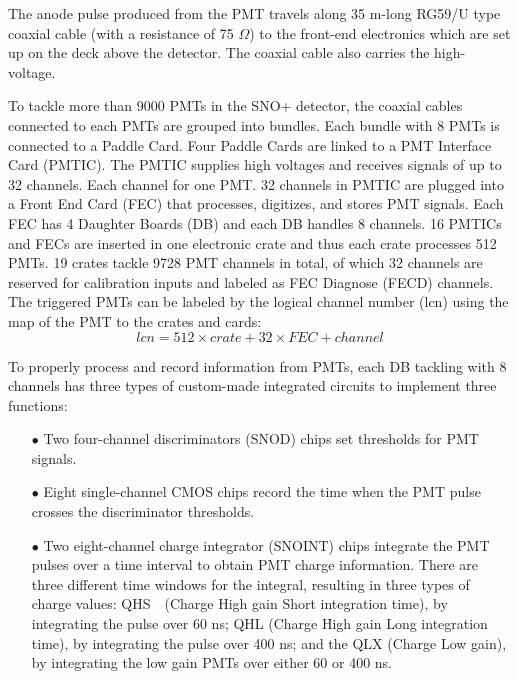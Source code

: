 The anode pulse produced from the PMT travels along 35 m-long RG59/U type coaxial cable (with a resistance of 75 $\Omega$) to the front-end electronics which are set up on the deck above the detector. The coaxial cable also carries the high-voltage\cite{boger2000sudbury}. 

To tackle more than 9000 PMTs in the SNO+ detector, the coaxial cables connected to each PMTs are grouped into bundles. Each bundle with 8 PMTs is connected to a Paddle Card. Four Paddle Cards are linked to a PMT Interface Card (PMTIC). The PMTIC supplies high voltages and receives signals of up to 32 channels. Each channel for one PMT. 32 channels in PMTIC are plugged into a Front End Card (FEC) that processes, digitizes, and stores PMT signals. Each FEC has 4 Daughter Boards (DB) and each DB handles 8 channels. 16 PMTICs and FECs are inserted in one electronic crate and thus each crate processes 512 PMTs. 19 crates tackle 9728 PMT channels in total, of which 32 channels are reserved for calibration inputs and labeled as FEC Diagnose (FECD) channels. The triggered PMTs can be labeled by the logical channel number (lcn) using the map of the PMT to the crates and cards\cite{snop_nim,stringer2019sensitivity}:
\begin{equation}
lcn = 512 \times crate + 32 \times FEC + channel
\end{equation}
 
To properly process and record information from PMTs, each DB tackling with 8 channels has three types of custom-made integrated circuits to implement three functions\cite{boger2000sudbury,bonventre2014neutron,snop_nim}:
\begin{itemize} 
\item[$\bullet$] Two four-channel discriminators (SNOD) chips set thresholds for PMT signals.
\item[$\bullet$] Eight single-channel CMOS chips record the time when the PMT pulse crosses the discriminator thresholds.
\item[$\bullet$] Two eight-channel charge integrator (SNOINT) chips integrate the PMT pulses over a time interval to obtain PMT charge information. There are three different time windows for the integral, resulting in three types of charge values: QHS　(Charge High gain Short integration time), by integrating the pulse over 60 ns; QHL (Charge High gain Long integration time), by integrating the pulse over 400 ns; and the QLX (Charge Low gain), by integrating the low gain PMTs over either 60 or 400 ns.
\end{itemize}

